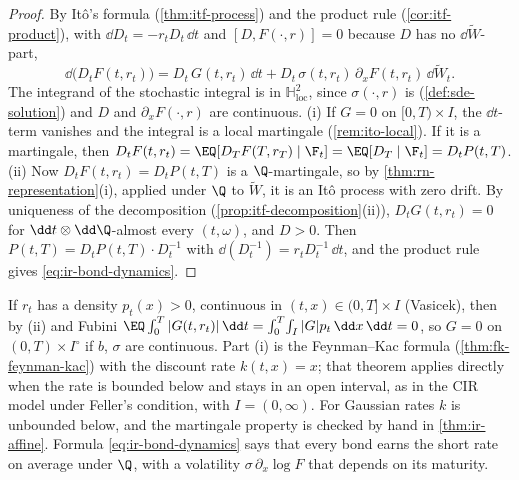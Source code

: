 \begin{proof}
By It\^o's formula (\cref{thm:itf-process}) and the product rule (\cref{cor:itf-product}), with
$\dd D_t=-r_tD_t\,\dd t$ and $[D,F(\cdot,r)]=0$ because $D$ has no $\dd\widetilde W$-part,
\[
  \dd\big(D_tF(t,r_t)\big)=D_t\,G(t,r_t)\,\dd t+D_t\,\sigma(t,r_t)\,\partial_xF(t,r_t)\,\dd\widetilde W_t .
\]
The integrand of the stochastic integral is in $\mathbb H^2_{\mathrm{loc}}$, since $\sigma(\cdot,r)$
is (\cref{def:sde-solution}) and $D$ and $\partial_xF(\cdot,r)$ are continuous.
(i) If $G=0$ on $[0,T)\times I$, the $\dd t$-term vanishes and the integral is a local martingale
(\cref{rem:ito-local}). If it is a martingale, then
$D_tF(t,r_t)=\EQ[D_TF(T,r_T)\mid\F_t]=\EQ[D_T\mid\F_t]=D_tP(t,T)$.
(ii) Now $D_tF(t,r_t)=D_tP(t,T)$ is a $\Q$-martingale, so by \cref{thm:rn-representation}(i),
applied under $\Q$ to $\widetilde W$, it is an It\^o process with zero drift. By uniqueness of the
decomposition (\cref{prop:itf-decomposition}(ii)), $D_tG(t,r_t)=0$ for $\dd t\otimes\dd\Q$-almost
every $(t,\omega)$, and $D>0$. Then $P(t,T)=D_tP(t,T)\cdot D_t^{-1}$ with
$\dd(D_t^{-1})=r_tD_t^{-1}\,\dd t$, and the product rule gives \eqref{eq:ir-bond-dynamics}.
\end{proof}

If $r_t$ has a density $p_t(x)>0$, continuous in $(t,x)\in(0,T]\times I$ (Vasicek), then by (ii) and
Fubini $\EQ\int_0^T|G(t,r_t)|\,\dd t=\int_0^T\!\int_I|G|p_t\,\dd x\,\dd t=0$, so $G=0$ on
$(0,T)\times I^\circ$ if $b$, $\sigma$ are continuous. Part (i) is the Feynman--Kac formula (\cref{thm:fk-feynman-kac}) with the discount rate
$k(t,x)=x$; that theorem applies directly when the rate is bounded below and stays in an open
interval, as in the CIR model under Feller's condition, with $I=(0,\infty)$.
For Gaussian rates $k$ is unbounded below, and the martingale property is checked by hand in
\cref{thm:ir-affine}. Formula \eqref{eq:ir-bond-dynamics} says that every bond earns the short
rate on average under $\Q$, with a volatility $\sigma\,\partial_x\log F$ that depends on its
maturity.

